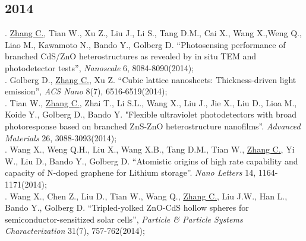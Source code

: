 \subsection*{2014}
. \underline{Zhang C.}, Tian W., Xu Z., Liu J., Li S., Tang D.M., Cai X., Wang X.,Weng Q., Liao M., Kawamoto N., Bando Y., Golberg D. “Photosensing performance of branched CdS/ZnO heterostructures as revealed by in situ TEM and photodetector tests”, {\em Nanoscale} 6, 8084-8090(2014);\\[5pt]
. Golberg D., \underline{Zhang C.}, Xu Z. “Cubic lattice nanosheets: Thickness-driven light emission”, {\em ACS Nano} 8(7), 6516-6519(2014);\\[5pt]
. Tian W., \underline{Zhang C.}, Zhai T., Li S.L., Wang X., Liu J., Jie X., Liu D., Lioa M., Koide Y., Golberg D., Bando Y. "Flexible ultraviolet photodetectors with broad photoresponse based on branched ZnS-ZnO heterostructure nanofilms”. {\em Advanced Materials} 26, 3088-3093(2014);\\[5pt]
. Wang X., Weng Q.H., Liu X., Wang X.B., Tang D.M., Tian W., \underline{Zhang C.}, Yi W., Liu D., Bando Y., Golberg D. “Atomistic origins of high rate capability and capacity of N-doped graphene for Lithium storage”. {\em Nano Letters} 14, 1164-1171(2014);\\[5pt]
. Wang X., Chen Z., Liu D., Tian W., Wang Q., \underline{Zhang C.}, Liu J.W., Han L., Bando Y., Golberg D. “Tripled-yolked ZnO-CdS hollow spheres for semiconductor-sensitized solar cells”, {\em Particle \& Particle Systems Characterization} 31(7), 757-762(2014);\\

